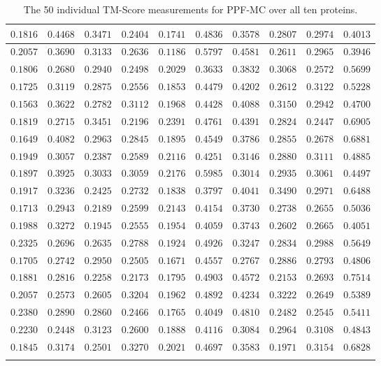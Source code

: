 \begin{longtable}{c|c|c|c|c|c|c|c|c|c}
$0.1816$ & $0.4468$ & $0.3471$ & $0.2404$ & $0.1741$ & $0.4836$ & $0.3578$ & $0.2807$ & $0.2974$ & $0.4013$ \\ \hline
$0.2057$ & $0.3690$ & $0.3133$ & $0.2636$ & $0.1186$ & $0.5797$ & $0.4581$ & $0.2611$ & $0.2965$ & $0.3946$ \\ \hline
$0.1806$ & $0.2680$ & $0.2940$ & $0.2498$ & $0.2029$ & $0.3633$ & $0.3832$ & $0.3068$ & $0.2572$ & $0.5699$ \\ \hline
$0.1725$ & $0.3119$ & $0.2875$ & $0.2556$ & $0.1853$ & $0.4479$ & $0.4202$ & $0.2612$ & $0.3122$ & $0.5228$ \\ \hline
$0.1563$ & $0.3622$ & $0.2782$ & $0.3112$ & $0.1968$ & $0.4428$ & $0.4088$ & $0.3150$ & $0.2942$ & $0.4700$ \\ \hline
$0.1819$ & $0.2715$ & $0.3451$ & $0.2196$ & $0.2391$ & $0.4761$ & $0.4391$ & $0.2824$ & $0.2447$ & $0.6905$ \\ \hline
$0.1649$ & $0.4082$ & $0.2963$ & $0.2845$ & $0.1895$ & $0.4549$ & $0.3786$ & $0.2855$ & $0.2678$ & $0.6881$ \\ \hline
$0.1949$ & $0.3057$ & $0.2387$ & $0.2589$ & $0.2116$ & $0.4251$ & $0.3146$ & $0.2880$ & $0.3111$ & $0.4885$ \\ \hline
$0.1897$ & $0.3925$ & $0.3033$ & $0.3059$ & $0.2176$ & $0.5985$ & $0.3014$ & $0.2935$ & $0.3061$ & $0.4497$ \\ \hline
$0.1917$ & $0.3236$ & $0.2425$ & $0.2732$ & $0.1838$ & $0.3797$ & $0.4041$ & $0.3490$ & $0.2971$ & $0.6488$ \\ \hline
$0.1713$ & $0.2943$ & $0.2189$ & $0.2599$ & $0.2143$ & $0.4154$ & $0.3730$ & $0.2738$ & $0.2655$ & $0.5036$ \\ \hline
$0.1988$ & $0.3272$ & $0.1945$ & $0.2555$ & $0.1954$ & $0.4059$ & $0.3743$ & $0.2602$ & $0.2665$ & $0.4051$ \\ \hline
$0.2325$ & $0.2696$ & $0.2635$ & $0.2788$ & $0.1924$ & $0.4926$ & $0.3247$ & $0.2834$ & $0.2988$ & $0.5649$ \\ \hline
$0.1705$ & $0.2742$ & $0.2950$ & $0.2505$ & $0.1671$ & $0.4557$ & $0.2767$ & $0.2886$ & $0.2793$ & $0.4806$ \\ \hline
$0.1881$ & $0.2816$ & $0.2258$ & $0.2173$ & $0.1795$ & $0.4903$ & $0.4572$ & $0.2153$ & $0.2693$ & $0.7514$ \\ \hline
$0.2057$ & $0.2573$ & $0.2605$ & $0.3204$ & $0.1962$ & $0.4892$ & $0.4234$ & $0.3222$ & $0.2649$ & $0.5389$ \\ \hline
$0.2380$ & $0.2890$ & $0.2860$ & $0.2466$ & $0.1765$ & $0.4049$ & $0.4810$ & $0.2482$ & $0.2545$ & $0.5411$ \\ \hline
$0.2230$ & $0.2448$ & $0.3123$ & $0.2600$ & $0.1888$ & $0.4116$ & $0.3084$ & $0.2964$ & $0.3108$ & $0.4843$ \\ \hline
$0.1845$ & $0.3174$ & $0.2501$ & $0.3270$ & $0.2021$ & $0.4697$ & $0.3583$ & $0.1971$ & $0.3154$ & $0.6828$ \\ \hline
\caption{The 50 individual TM-Score measurements for PPF-MC over all ten proteins.}
\end{longtable}

